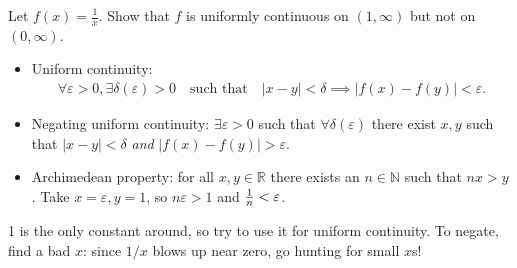 Let \(f(x) = \frac 1 x\). Show that \(f\) is uniformly continuous on
\((1, \infty)\) but not on \((0,\infty)\).

\begin{concept}

\envlist

\begin{itemize}
\item
  Uniform continuity:
  \begin{align*}  
  \forall \varepsilon>0, \exists \delta({\varepsilon})>0 \quad\text{such that}\quad {\left\lvert {x-y} \right\rvert}<\delta \implies {\left\lvert {f(x) - f(y)} \right\rvert} < {\varepsilon}
  .\end{align*}
\item
  Negating uniform continuity: \(\exists {\varepsilon}> 0\) such that
  \(\forall \delta({\varepsilon})\) there exist \(x, y\) such that
  \({\left\lvert {x-y} \right\rvert} < \delta\) \emph{and}
  \({\left\lvert {f(x) - f(y)} \right\rvert} > {\varepsilon}\).
\item
  Archimedean property: for all \(x,y\in {\mathbb{R}}\) there exists an
  \(n \in {\mathbb{N}}\) such that \(nx>y\). Take
  \(x={\varepsilon}, y=1\), so \(n{\varepsilon}> 1\) and
  \({1\over n} < {\varepsilon}\).
\end{itemize}

\end{concept}

\begin{strategy}

1 is the only constant around, so try to use it for uniform continuity.
To negate, find a bad \(x\): since \(1/x\) blows up near zero, go
hunting for small \(x\)s!

\end{strategy}

